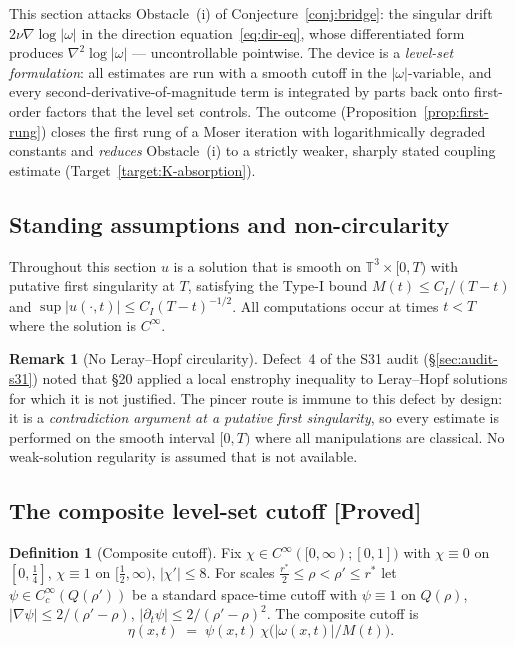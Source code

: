 \documentclass[11pt]{article}
\theoremstyle{definition}
\newtheorem{definition}[theorem]{Definition}
\newtheorem{remark}[theorem]{Remark}
\theoremstyle{remark}
\newcommand{\T}{\mathbb{T}}
\begin{document}
This section attacks Obstacle~(i) of Conjecture~\ref{conj:bridge}: the
singular drift $2\nu\nabla\log|\omega|$ in the direction
equation~\eqref{eq:dir-eq}, whose differentiated form produces
$\nabla^2\log|\omega|$ --- uncontrollable pointwise. The device is a
\emph{level-set formulation}: all estimates are run with a smooth cutoff in
the $|\omega|$-variable, and every second-derivative-of-magnitude term is
integrated by parts back onto first-order factors that the level set
controls. The outcome (Proposition~\ref{prop:first-rung}) closes the first
rung of a Moser iteration with logarithmically degraded constants and
\emph{reduces} Obstacle~(i) to a strictly weaker, sharply stated coupling
estimate (Target~\ref{target:K-absorption}).

\subsection{Standing assumptions and non-circularity}

Throughout this section $u$ is a solution that is smooth on
$\T^3\times[0,T)$ with putative first singularity at $T$, satisfying the
Type-I bound $M(t)\leq C_I/(T-t)$ and $\sup|u(\cdot,t)|\leq C_I(T-t)^{-1/2}$.
All computations occur at times $t<T$ where the solution is $C^\infty$.

\begin{remark}[No Leray--Hopf circularity]\label{rem:no-circularity}
  Defect~4 of the S31 audit (\S\ref{sec:audit-s31}) noted that \S20 applied
  a local enstrophy inequality to Leray--Hopf solutions for which it is not
  justified. The pincer route is immune to this defect by design: it is a
  \emph{contradiction argument at a putative first singularity}, so every
  estimate is performed on the smooth interval $[0,T)$ where all
  manipulations are classical. No weak-solution regularity is assumed that
  is not available.
\end{remark}

\subsection{The composite level-set cutoff [Proved]}

\begin{definition}[Composite cutoff]\label{def:composite-cutoff}
  Fix $\chi\in C^\infty([0,\infty);[0,1])$ with $\chi\equiv 0$ on
  $[0,\tfrac14]$, $\chi\equiv 1$ on $[\tfrac12,\infty)$,
  $|\chi'|\leq 8$. For scales $\tfrac{r^*}{2}\leq\rho<\rho'\leq r^*$ let
  $\psi\in C_c^\infty(Q(\rho'))$ be a standard space-time cutoff with
  $\psi\equiv 1$ on $Q(\rho)$,
  $|\nabla\psi|\leq 2/(\rho'-\rho)$, $|\partial_t\psi|\leq 2/(\rho'-\rho)^2$.
  The composite cutoff is
  \[
    \eta(x,t) \;=\; \psi(x,t)\,\chi\!\bigl(|\omega(x,t)|/M(t)\bigr).
  \]
\end{definition}
\end{document}
